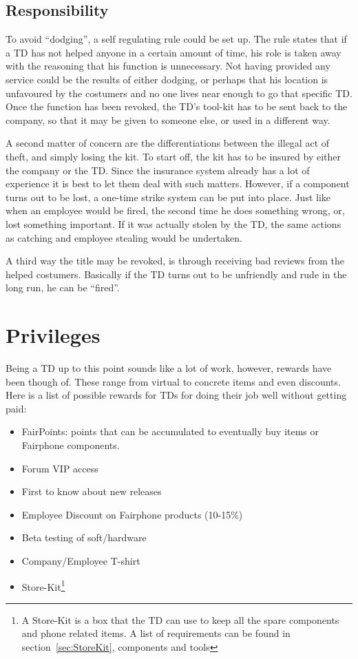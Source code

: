 \documentclass[final,a4paper]{report} %
\begin{document}
\subsection{Responsibility}
To avoid ``dodging'', a self regulating rule could be set up. The rule states that if a TD has not helped anyone in a certain amount of time, his role is taken away with the reasoning that his function is unnecessary. Not having provided any service could be the results of either dodging, or perhaps that his location is unfavoured by the costumers and no one lives near enough to go that specific TD. Once the function has been revoked, the TD's tool-kit has to be sent back to the company, so that it may be given to someone else, or used in a different way.

A second matter of concern are the differentiations between the illegal act of theft, and simply losing the kit. To start off, the kit has to be insured by either the company or the TD. Since the insurance system already has a lot of experience it is best to let them deal with such matters. However, if a component turns out to be lost, a one-time strike system can be put into place. Just like when an employee would be fired, the second time he does something wrong, or, lost something important. If it was actually stolen by the TD, the same actions as catching and employee stealing would be undertaken. 

A third way the title may be revoked, is through receiving bad reviews from the helped costumers. Basically if the TD turns out to be unfriendly and rude in the long run, he can be ``fired''.

\section{Privileges} 
Being a TD up to this point sounds like a lot of work, however, rewards have been though of. These range from virtual to concrete items and even discounts. Here is a list of possible rewards for TDs for doing their job well without getting paid:

\begin{itemize}
	\item FairPoints: points that can be accumulated to eventually buy items or Fairphone components.
	\item Forum VIP access
	\item First to know about new releases
	\item Employee Discount on Fairphone products (10-15\%)
	\item Beta testing of soft/hardware
	\item Company/Employee T-shirt
	\item Store-Kit\footnote{A Store-Kit is a box that the TD can use to keep all the spare components and phone related items. A list of requirements can be found in section~\ref{sec:StoreKit}, components and tools}
	\end{itemize}
\end{document}

